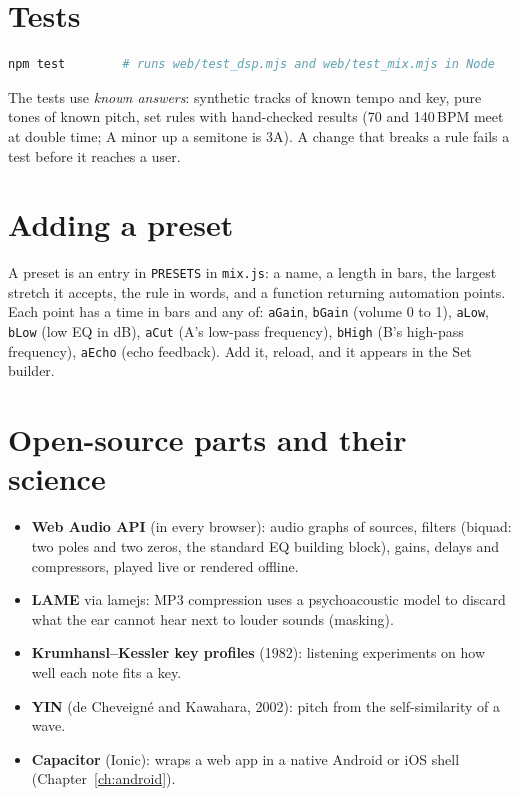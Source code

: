 \section{Tests}
\begin{lstlisting}[language=bash]
npm test        # runs web/test_dsp.mjs and web/test_mix.mjs in Node
\end{lstlisting}
The tests use \emph{known answers}: synthetic tracks of known tempo and key, pure tones of known pitch, set rules with hand-checked results (70 and 140\,BPM meet at double time; A minor up a semitone is 3A). A change that breaks a rule fails a test before it reaches a user.

\section{Adding a preset}
A preset is an entry in \texttt{PRESETS} in \texttt{mix.js}: a name, a length in bars, the largest stretch it accepts, the rule in words, and a function returning automation points. Each point has a time in bars and any of: \texttt{aGain}, \texttt{bGain} (volume 0 to 1), \texttt{aLow}, \texttt{bLow} (low EQ in dB), \texttt{aCut} (A's low-pass frequency), \texttt{bHigh} (B's high-pass frequency), \texttt{aEcho} (echo feedback). Add it, reload, and it appears in the Set builder.

\section{Open-source parts and their science}
\begin{itemize}
\item \textbf{Web Audio API} (in every browser): audio graphs of sources, filters (biquad: two poles and two zeros, the standard EQ building block), gains, delays and compressors, played live or rendered offline.
\item \textbf{LAME} via lamejs: MP3 compression uses a psychoacoustic model to discard what the ear cannot hear next to louder sounds (masking).
\item \textbf{Krumhansl--Kessler key profiles} (1982): listening experiments on how well each note fits a key.
\item \textbf{YIN} (de Cheveign\'e and Kawahara, 2002): pitch from the self-similarity of a wave.
\item \textbf{Capacitor} (Ionic): wraps a web app in a native Android or iOS shell (Chapter~\ref{ch:android}).
\end{itemize}
